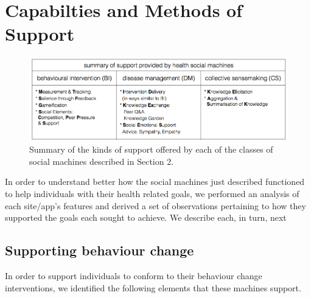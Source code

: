 \documentclass{sig-alternate}
\begin{document}
\section{Capabilties and Methods of Support}

\begin{figure}[htb]
\begin{center}
\includegraphics[width=16cm]{img/table2-summary.png}
\caption{Summary of the kinds of support offered by each of the classes of social machines described in Section 2.} \label{fig:summaryofsupport}
\end{center}
\end{figure}


In order to understand better how the social machines just described
functioned to help individuals with their health related goals, we
performed an analysis of each site/app's features and derived a set of
observations pertaining to how they supported the goals each sought to
achieve.  We describe each, in turn, next

\subsection{Supporting behaviour change}

In order to support individuals to conform to their behaviour change
interventions, we identified the following elements that these machines
support.
\end{document}
